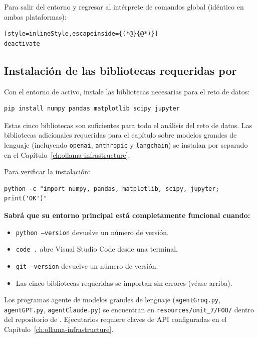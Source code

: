 Para salir del entorno y regresar al intérprete de comandos global (idéntico
en ambas plataformas):

\begin{lstlisting}[style=inlineStyle,escapeinside={(*@}{@*)}]
deactivate
\end{lstlisting}

\subsection{Instalación de las bibliotecas requeridas por \ProjectName{}}
\label{sec:project-libraries}

Con el entorno de \ProjectName{} activo, instale las bibliotecas necesarias
para el reto de datos:

\begin{verbatim}
pip install numpy pandas matplotlib scipy jupyter
\end{verbatim}

Estas cinco bibliotecas son suficientes para todo el análisis del reto de
datos. Las bibliotecas adicionales requeridas para el capítulo sobre modelos
grandes de lenguaje (incluyendo \texttt{openai}, \texttt{anthropic} y
\texttt{langchain}) se instalan por separado en el
Capítulo~\ref{ch:ollama-infrastructure}.

\vs
\noindent
Para verificar la instalación:

\begin{verbatim}
python -c "import numpy, pandas, matplotlib, scipy, jupyter; print('OK')"
\end{verbatim}

\vs
\noindent
\textbf{Sabrá que su entorno principal está completamente funcional cuando:}
\begin{itemize}
    \item \texttt{python --version} devuelve un número de versión.
    \item \texttt{code .} abre Visual Studio Code desde una terminal.
    \item \texttt{git --version} devuelve un número de versión.
    \item Las cinco bibliotecas requeridas se importan sin errores (véase arriba).
\end{itemize}
Los programas agente de modelos grandes de lenguaje (\texttt{agentGroq.py},
\texttt{agentGPT.py}, \texttt{agentClaude.py}) se encuentran en
\texttt{resources/unit\_7/FOO/} dentro del repositorio de \ProjectName{}.
Ejecutarlos requiere claves de API configuradas en el
Capítulo~\ref{ch:ollama-infrastructure}.
\vs

